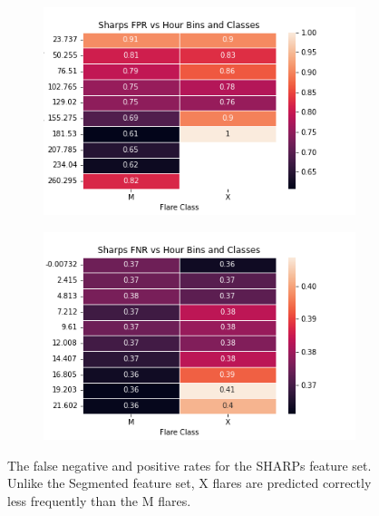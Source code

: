 \documentclass[defaultstyle,11pt]{thesis}
\begin{document}
\begin{figure}[h]
\centering
\begin{subfigure}[b]{.45\textwidth}
    \includegraphics[width=\linewidth]{ThesisFilePkg/figures/findings/SHARPsFPR.png}
\end{subfigure}
\begin{subfigure}[b]{.45\textwidth}
    \includegraphics[width=\linewidth]{ThesisFilePkg/figures/findings/SHARPsFNR.png}
\end{subfigure}
\label{fig:shpfr}
\caption{The false negative and positive rates for the SHARPs feature set. Unlike the Segmented feature set, X flares are predicted correctly less frequently than the M flares.}
\end{figure}
\end{document}
